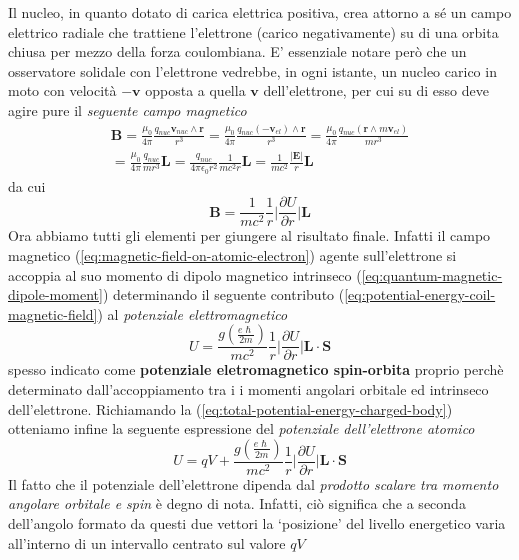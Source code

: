 Il nucleo, in quanto dotato di carica elettrica positiva, crea attorno a sé un campo elettrico radiale che trattiene l’elettrone (carico negativamente) su di una orbita chiusa per mezzo della forza coulombiana. E’ essenziale notare però che un osservatore solidale con l’elettrone vedrebbe, in ogni istante,  un nucleo carico in moto con velocità $- \bm{v}$ opposta a quella $\bm{v}$ dell’elettrone, per cui su di esso deve agire pure il \emph{seguente campo magnetico}
\begin{gather*}
\bm{B} = \frac{\mu_{0}}{4 \pi} \frac{q_{nuc} \bm{v}_{nuc} \wedge \bm{r}}{r^{3}} = \frac{\mu_{0}}{4 \pi} \frac{q_{nuc} (-\bm{v}_{el}) \wedge \bm{r}}{r^{3}} = \frac{\mu_{0}}{4 \pi} \frac{q_{nuc} (\bm{r} \wedge m\bm{v}_{el})}{mr^{3}} \\
= \frac{\mu_{0}}{4 \pi} \frac{q_{nuc}}{m r^{3}} \bm{L}  = \frac{q_{nuc}}{4 \pi \epsilon_{0}r^{2}} \frac{1}{mc^{2}r} \bm{L} = \frac{1}{mc^{2}}  \frac{|\bm{E}|}{r} \bm{L}
\end{gather*}
da cui
\begin{equation}
	\bm{B} = \frac{1}{mc^{2}} \frac{1}{r} \bigg|\frac{ \partial U }{ \partial r }  \bigg| \bm{L}
	\label{eq:magnetic-field-on-atomic-electron}
\end{equation}
Ora abbiamo tutti gli elementi per giungere al risultato finale.
Infatti il campo magnetico (\ref{eq:magnetic-field-on-atomic-electron}) agente sull’elettrone si accoppia al suo momento di dipolo magnetico intrinseco (\ref{eq:quantum-magnetic-dipole-moment}) determinando il seguente contributo (\ref{eq:potential-energy-coil-magnetic-field}) al \emph{potenziale elettromagnetico}
\begin{equation}
	U = \frac{g \left( \frac{e\hslash}{2m} \right)}{m c^{2}} \frac{1}{r} \bigg| \frac{ \partial U }{ \partial r }  \bigg| \bm{L} \cdot \bm{S}
	\label{eq:spin-orbit-em-potential}
\end{equation}
spesso indicato come \textbf{potenziale eletromagnetico spin-orbita} proprio perchè determinato dall’accoppiamento tra i i momenti angolari orbitale ed intrinseco dell’elettrone.
Richiamando la (\ref{eq:total-potential-energy-charged-body}) otteniamo infine la seguente espressione del \emph{potenziale dell’elettrone atomico}
\begin{equation}
	U = qV + \frac{g \left( \frac{e\hslash}{2m} \right)}{m c^{2}} \frac{1}{r} \bigg| \frac{ \partial U }{ \partial r }  \bigg| \bm{L} \cdot \bm{S}
	\label{eq:total-em-potential-spin-orbit}
\end{equation}
Il fatto che il potenziale dell’elettrone dipenda dal \emph{prodotto scalare tra momento angolare orbitale e spin} è degno di nota. Infatti, ciò significa che a seconda dell’angolo formato da questi due vettori la ‘posizione’ del livello energetico varia all’interno di un intervallo centrato sul valore $qV$
